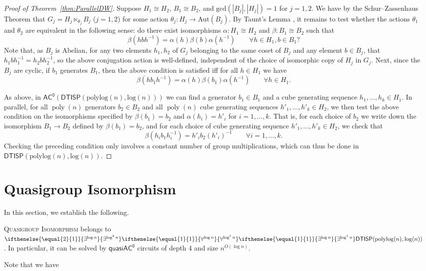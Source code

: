 \documentclass{theoretics}
\newcommand{\algprobm}[1]{\textsc{#1}\xspace}
\newcommand{\betacc}[1]{\ifthenelse{\equal{#1}{1}}{\exists^{\log n}}{\exists^{\log^{#1}n}}} %
\newcommand{\alphacc}[1]{\ifthenelse{\equal{#1}{1}}{\forall^{\log n}}{\forall^{\log^{#1}n}}} %
\newcommand{\Oh}{O}
\DeclareMathOperator{\poly}{poly}
\newcommand*{\ComplexityClass}[1]{\ensuremath{\mathsf{#1}}\xspace}
\newcommand{\DTISP}{\ComplexityClass{DTISP}}
\newcommand{\DTISPpll}{\ensuremath{\DTISP(\mathrm{polylog}(n),\mathrm{log}(n))}\xspace}
\newcommand{\ACz}{\ComplexityClass{AC^0}}
\newcommand{\qACz}{\ComplexityClass{quasiAC^0}}
\begin{document}
\begin{proof}[Proof of Theorem~\ref{thm:ParallelDW}]
Suppose $H_{1} \cong H_{2}$, $B_{1} \cong B_{2}$, and $\text{gcd}(|B_{j}|, |H_{j}|) = 1$ for $j = 1,2$. We have by the Schur--Zassenhaus Theorem that $G_{j} = H_{j} \ltimes_{\theta_{j}} B_{j}$ ($j = 1,2$) for some action $\theta_j \colon H_j \to \text{Aut}(B_j)$. By Taunt's Lemma \cite{Taunt1955}, it remains to test whether the actions $\theta_{1}$ and $\theta_{2}$ are equivalent in the following sense: do there exist  isomorphisms $\alpha \colon H_1 \cong H_2$ and $\beta \colon B_1 \cong B_2$ such that
\[
\beta(h bh^{-1}) = \alpha(h) \beta(b) \alpha(h^{-1}) \qquad \forall h \in H_1, b \in B_1?
\]
Note that, as $B_{j}$ is Abelian, for any two elements $h_{1}, h_{2}$ of $G_{j}$ belonging to the same coset of $B_j$ and any element $b \in B_{j}$, that $h_{1}bh_{1}^{-1} = h_{2}bh_{2}^{-1}$, so the above conjugation action is well-defined, independent of the choice of isomorphic copy of $H_j$ in $G_j$. Next, since the $B_j$ are cyclic, if $b_1$ generates $B_1$, then the above condition is satisfied iff for all $h \in H_1$ we have
\[
\beta(h b_1 h^{-1}) = \alpha(h) \beta(b_1) \alpha(h^{-1}) \qquad \forall h \in H_1.
\]

As above, in $\ACz(\DTISPpll)$ we can find a generator $b_1 \in B_1$ and a cube generating sequence $h_1,\dotsc,h_k \in H_1$. In parallel, for all $\poly(n)$ generators $b_2 \in B_2$ and all $\poly(n)$ cube generating sequences $h'_1,\dotsc,h'_k \in H_2$, we then test the above condition on the isomorphisms specified by $\beta(b_1) = b_2$ and $\alpha(h_i) = h'_i$ for $i=1,\dotsc,k$. That is, for each choice of $b_2$ we write down the isomorphism $B_1 \to B_2$ defined by $\beta(b_1) = b_2$, and for each choice of cube generating sequence $h'_1,\dotsc,h'_k \in H_2$, we check that
\[
\beta(h_i b_1 h_i^{-1}) = h'_i b_2 (h'_i)^{-1} \qquad \forall i=1,\dotsc,k.
\]
Checking the preceding condition only involves a constant number of group multiplications, which can thus be done in $\DTISPpll$.\qedhere
\end{proof}





\section{Quasigroup Isomorphism} \label{sec:QuasigroupIsomorphism}

In this section, we establish the following.

\begin{theorem} \label{thm:QuasigroupIsoPolylogtime}
\algprobm{Quasigroup Isomorphism} belongs to $\betacc{2}\alphacc{1}\betacc{1}\DTISPpll$. In particular, it can be solved by $\qACz$ circuits of depth 4 and size $n^{\Oh(\log n)}$.
\end{theorem}
Note that we have 
\end{document}
